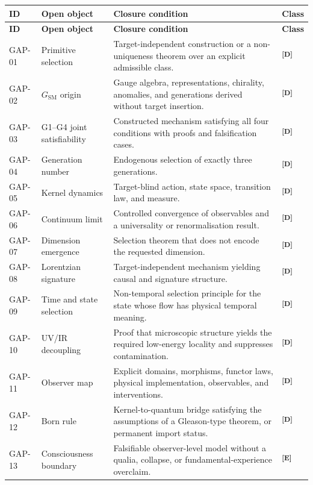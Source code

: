 \documentclass[12pt,a4paper,twoside]{article}
\theoremstyle{plain}
\theoremstyle{definition}
\theoremstyle{remark}
\newcommand{\catmark}[1]{\textsuperscript{\textsf{\textbf{[#1]}}}}
\begin{document}
\begin{longtable}{@{}p{1.05cm}p{4.15cm}p{6.45cm}p{1.05cm}@{}}
\toprule
\textbf{ID} & \textbf{Open object} & \textbf{Closure condition} &
\textbf{Class}\\
\midrule
\endfirsthead
\toprule
\textbf{ID} & \textbf{Open object} & \textbf{Closure condition} &
\textbf{Class}\\
\midrule
\endhead
GAP-01 & Primitive selection & Target-independent construction or a
non-uniqueness theorem over an explicit admissible class. & \catmark{D}\\
GAP-02 & $G_{\mathrm{SM}}$ origin & Gauge algebra, representations, chirality,
anomalies, and generations derived without target insertion. & \catmark{D}\\
GAP-03 & G1--G4 joint satisfiability & Constructed mechanism satisfying all
four conditions with proofs and falsification cases. & \catmark{D}\\
GAP-04 & Generation number & Endogenous selection of exactly three generations.
& \catmark{D}\\
GAP-05 & Kernel dynamics & Target-blind action, state space, transition law,
and measure. & \catmark{D}\\
GAP-06 & Continuum limit & Controlled convergence of observables and a
universality or renormalisation result. & \catmark{D}\\
GAP-07 & Dimension emergence & Selection theorem that does not encode the
requested dimension. & \catmark{D}\\
GAP-08 & Lorentzian signature & Target-independent mechanism yielding causal
and signature structure. & \catmark{D}\\
GAP-09 & Time and state selection & Non-temporal selection principle for the
state whose flow has physical temporal meaning. & \catmark{D}\\
GAP-10 & UV/IR decoupling & Proof that microscopic structure yields the
required low-energy locality and suppresses contamination. & \catmark{D}\\
GAP-11 & Observer map & Explicit domains, morphisms, functor laws, physical
implementation, observables, and interventions. & \catmark{D}\\
GAP-12 & Born rule & Kernel-to-quantum bridge satisfying the assumptions of a
Gleason-type theorem, or permanent import status. & \catmark{D}\\
GAP-13 & Consciousness boundary & Falsifiable observer-level model without a
qualia, collapse, or fundamental-experience overclaim. & \catmark{E}\\

\end{longtable}
\end{document}
